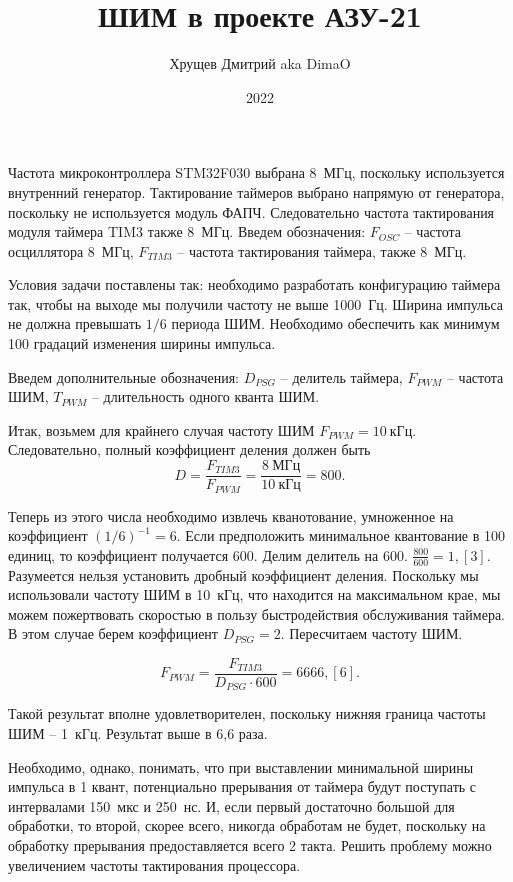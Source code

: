 \documentclass[12pt,a4paper]{article}
\author{Хрущев Дмитрий aka DimaO}
\title{ШИМ в проекте АЗУ-21}
\date{2022}
\begin{document}
\maketitle
\newpage

Частота микроконтроллера STM32F030 выбрана 8~МГц, поскольку используется внутренний генератор. Тактирование таймеров выбрано напрямую от генератора, поскольку не используется модуль ФАПЧ. Следовательно частота тактирования модуля таймера TIM3 также 8~МГц. Введем обозначения: $F_{OSC}$ -- частота осциллятора 8~МГц, $F_{TIM3}$ -- частота тактирования таймера, также 8~МГц.

Условия задачи поставлены так: необходимо разработать конфигурацию таймера так, чтобы на выходе мы получили частоту не выше 1000~Гц. Ширина импульса не должна превышать $1/6$ периода ШИМ. Необходимо обеспечить как минимум 100 градаций изменения ширины импульса.

Введем дополнительные обозначения: $D_{PSG}$ -- делитель таймера, $F_{PWM}$ -- частота ШИМ, $T_{PWM}$ -- длительность одного кванта ШИМ.

Итак, возьмем для крайнего случая частоту ШИМ $F_{PWM}=10~\mbox{кГц}$. Следовательно, полный коэффициент деления должен быть
\begin{equation}
D=\frac{F_{TIM3}}{F_{PWM}}=\frac{8~\mbox{МГц}}{10~\mbox{кГц}}=800.
\end{equation}

Теперь из этого числа необходимо извлечь кванотование, умноженное на коэффициент $\left(1/6\right)^{-1}=6$. Если предположить минимальное квантование в 100 единиц, то коэффициент получается 600. Делим делитель на 600. $\frac{800}{600}=1,\left[3\right]$. Разумеется нельзя установить дробный коэффициент деления. Поскольку мы использовали частоту ШИМ в 10~кГц, что находится на максимальном крае, мы можем пожертвовать скоростью в пользу быстродействия обслуживания таймера. В этом случае берем коэффициент $D_{PSG}=2$. Пересчитаем частоту ШИМ.

\begin{equation}
F_{PWM}=\frac{F_{TIM3}}{D_{PSG}\cdot 600}=6666,[6].
\end{equation}

Такой результат вполне удовлетворителен, поскольку нижняя граница частоты ШИМ -- 1~кГц. Результат выше в 6,6 раза.

Необходимо, однако, понимать, что при выставлении минимальной ширины импульса в 1 квант, потенциально прерывания от таймера будут поступать с интервалами 150~мкс и 250~нс. И, если первый достаточно большой для обработки, то второй, скорее всего, никогда обработам не будет, поскольку на обработку прерывания предоставляется всего 2 такта. Решить проблему можно увеличением частоты тактирования процессора.
\end{document}
